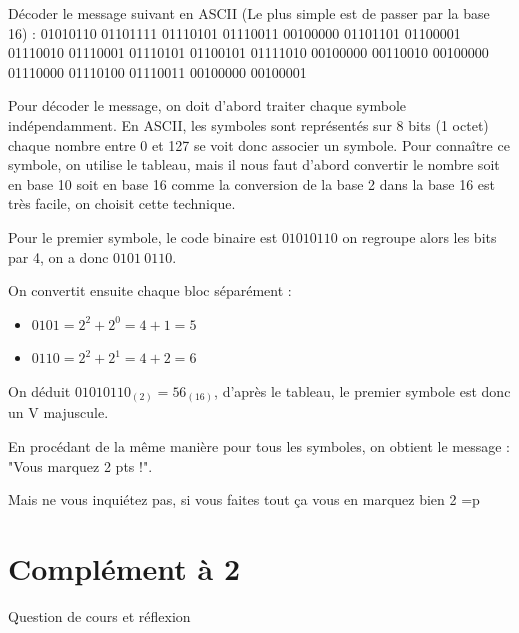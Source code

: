 \documentclass[a4paper, noanswers, addpoints, 12pt]{exam}
\begin{document}
\begin{questions}
\begin{tcolorbox}[enhanced,
    colback=yellow!25!black!10!white,colframe=yellow!75!black,title=Rappel,
    drop fuzzy shadow,watermark color=white]
    
\end{tcolorbox}
\question[2] Décoder le message suivant en ASCII (Le plus simple est de passer par la base 16) : 
01010110 01101111 01110101 01110011 00100000 01101101 01100001 01110010 01110001 01110101 01100101 01111010 00100000 00110010 00100000 01110000 01110100 01110011 00100000 00100001

\begin{solution}[5\bigskipamount]
    Pour décoder le message, on doit d'abord traiter chaque symbole indépendamment. En ASCII, les symboles sont représentés sur 8 bits (1 octet) chaque nombre entre 0 et 127 se voit donc associer un symbole.
    Pour connaître ce symbole, on utilise le tableau, mais il nous faut d'abord convertir le nombre soit en base 10 soit en base 16 comme la conversion de la base 2 dans la base 16 est très facile, on choisit cette technique.

    Pour le premier symbole, le code binaire est $01010110$ on regroupe alors les bits par 4, on a donc $0101\ 0110$.
    
    On convertit ensuite chaque bloc séparément :
    \begin{itemize}
        \item $0101 = 2^2 + 2^0 = 4 + 1 = 5$
        \item $0110 = 2^2 + 2^1 = 4 + 2 = 6$
    \end{itemize}
    On déduit $01010110_{(2)} = 56_{(16)}$, d'après le tableau, le premier symbole est donc un V majuscule.

    En procédant de la même manière pour tous les symboles, on obtient le message : "Vous marquez 2 pts !".

    Mais ne vous inquiétez pas, si vous faites tout ça vous en marquez bien 2 =p
\end{solution}


\section{Complément à 2}

\question[3] Question de cours et réflexion
\end{questions}
\end{document}
